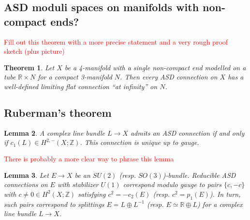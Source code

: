 \documentclass[a4paper]{article}
\newcommand{\Z}{\mathbb{Z}}
\newcommand{\R}{\mathbb{R}}
\newcommand{\ra}{\rightarrow}
\newtheorem{theorem}{Theorem}
\newtheorem{lemma}[theorem]{Lemma}
\theoremstyle{definition}
\numberwithin{theorem}{subsection}
\begin{document}
\subsection{ASD moduli spaces on manifolds with non-compact ends?}

\textcolor{red}{Fill out this theorem with a more precise statement and a very rough proof sketch (plus picture)}
\begin{theorem}\label{LimitingEndTheorem}
    Let $X$ be a 4-manifold with a single non-compact end modelled on a tube $\R\times N$ for a compact 3-manifold $N$. Then every ASD connection on $X$ has a well-defined limiting flat connection ``at infinity'' on $N$. 
\end{theorem}

\subsection{Ruberman's theorem}

\begin{lemma}\label{ASDlinebundle}
    A complex line bundle $L\ra X$ admits an ASD connection if and only if $c_1(L)\in H^{2,-}(X;\Z)$. This connection is unique up to gauge. 
\end{lemma}

\textcolor{red}{There is probably a more clear way to phrase this lemma}
\begin{lemma}\label{ReducibleClassification}
    Let $E\ra X$ be an $SU(2)$ (resp. $SO(3)$)-bundle. Reducible ASD connections on $E$ with stabilizer $U(1)$ correspond modulo gauge to pairs $\{c,-c\}$ with $c\neq 0\in H^{2}(X;\Z)$ satisfying $c^2=-c_2(E)$ (resp. $c^2=p_1(E)$). In turn, such pairs correspond to splittings $E=L\oplus L^{-1}$ (resp. $E\simeq \R\oplus L$) for a complex line bundle $L\ra X$. 
\end{lemma}
\end{document}
